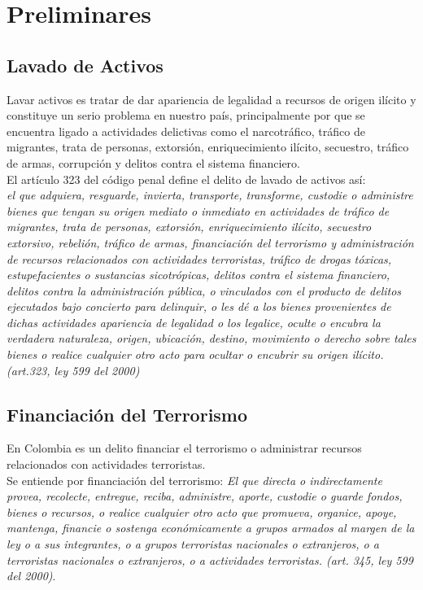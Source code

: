 \chapter{Preliminares}
\label{chap:preliminares}
\section{Lavado de Activos}

Lavar activos es tratar de dar apariencia de legalidad a recursos de origen ilícito y constituye un serio problema en nuestro país, principalmente por que se encuentra ligado a actividades delictivas como el narcotráfico, tráfico de migrantes, trata de personas, extorsión, enriquecimiento ilícito, secuestro, tráfico de armas, corrupción y delitos contra el sistema financiero.\\[3mm]

El artículo 323 del  código penal define el delito de lavado de activos así:\\

\textit{el que adquiera, resguarde, invierta, transporte, transforme, custodie o administre bienes que tengan su origen mediato o inmediato en actividades de tráfico de migrantes, trata de personas, extorsión, enriquecimiento ilícito, secuestro extorsivo, rebelión, tráfico de armas, financiación del terrorismo y administración de recursos relacionados con actividades terroristas, tráfico de drogas tóxicas, estupefacientes o sustancias sicotrópicas, delitos contra el sistema financiero, delitos contra la administración pública, o vinculados con el producto de delitos ejecutados bajo concierto para delinquir, o les dé a los bienes provenientes de dichas actividades apariencia de legalidad o los legalice, oculte o encubra la verdadera naturaleza, origen, ubicación, destino, movimiento o derecho sobre tales bienes o realice cualquier otro acto para ocultar o encubrir su origen ilícito. (art.323, ley 599 del 2000)}

\section{Financiación del Terrorismo}

En Colombia es un delito financiar el terrorismo o administrar recursos relacionados con actividades terroristas.\\[3mm]

Se entiende por financiación del terrorismo: \emph{El que directa o indirectamente provea, recolecte, entregue, reciba, administre, aporte, custodie o guarde fondos, bienes o recursos, o realice cualquier otro acto que promueva, organice, apoye, mantenga, financie o sostenga económicamente a grupos armados al margen de la ley o a sus integrantes, o a grupos terroristas nacionales o extranjeros, o a terroristas nacionales o extranjeros, o a actividades terroristas. (art. 345, ley 599 del 2000)}.\par 


